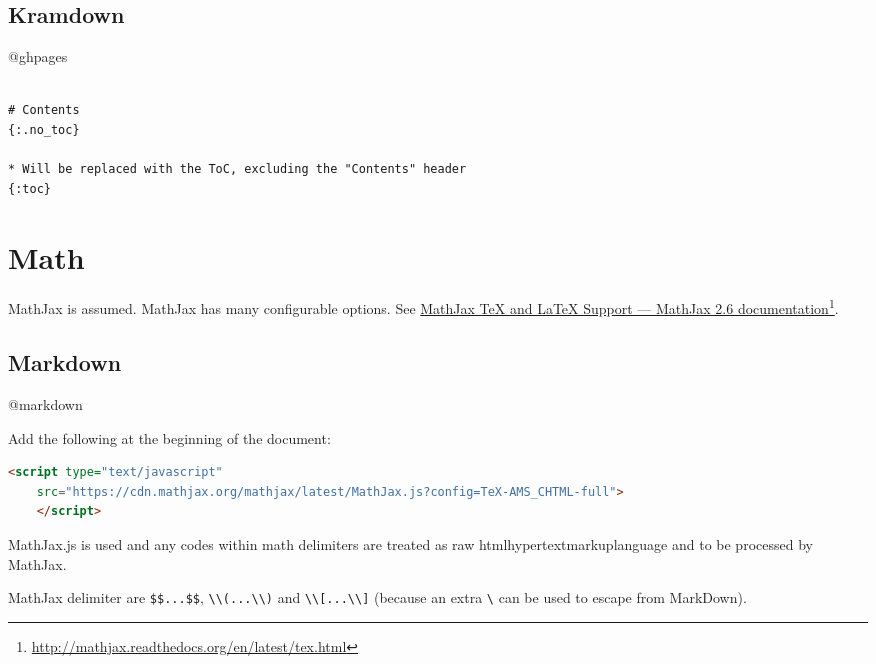 \subsection{Kramdown}
\label{kramdown}

@ghpages

\begin{adjustwidth}{2.5em}{2.5em}
\begin{verbatim}

# Contents
{:.no_toc}

* Will be replaced with the ToC, excluding the "Contents" header
{:toc}

\end{verbatim}
\end{adjustwidth}

\section{Math}
\label{math}

MathJax is assumed. MathJax has many configurable options. See \href{http://mathjax.readthedocs.org/en/latest/tex.html}{MathJax TeX and LaTeX Support — MathJax 2.6 documentation}\footnote{\href{http://mathjax.readthedocs.org/en/latest/tex.html}{http:/\slash mathjax.readthedocs.org\slash en\slash latest\slash tex.html}}.

\subsection{Markdown}
\label{markdown}

@markdown

Add the following at the beginning of the document:

\begin{adjustwidth}{2.5em}{2.5em}
\begin{lstlisting}[language=html]
<script type="text/javascript"
    src="https://cdn.mathjax.org/mathjax/latest/MathJax.js?config=TeX-AMS_CHTML-full">
    </script>

\end{lstlisting}
\end{adjustwidth}

MathJax.js is used and any codes within math delimiters are treated as raw \ac{htmlhypertextmarkuplanguage} and to be processed by MathJax.

MathJax delimiter are \texttt{\$\$...\$\$}, \texttt{\textbackslash{}\textbackslash{}(...\textbackslash{}\textbackslash{})} and \texttt{\textbackslash{}\textbackslash{}[...\textbackslash{}\textbackslash{}]} (because an extra \texttt{\textbackslash{}} can be used to escape from MarkDown).

